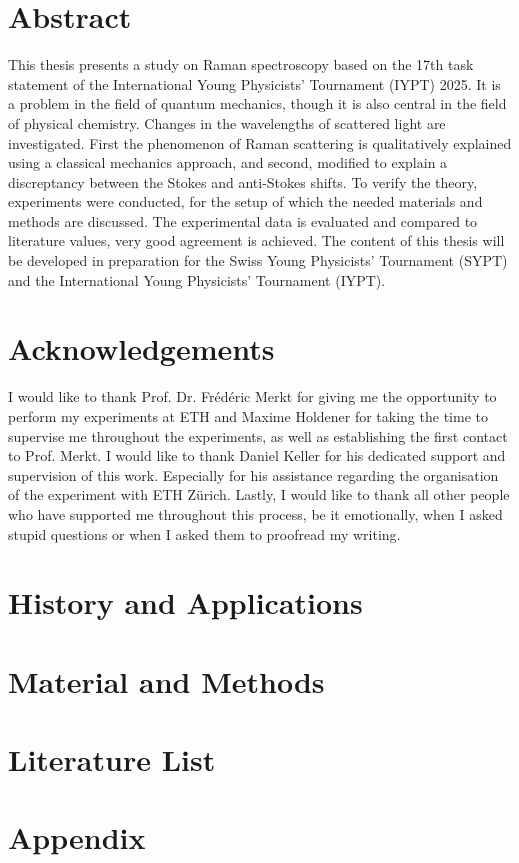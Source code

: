 \documentclass[a4paper]{article}
\begin{document}
\section*{Abstract}

This thesis presents a study on Raman spectroscopy based on the 17th task statement of the International Young Physicists' Tournament (IYPT) 2025. It is a problem in the field of quantum mechanics, though it is also central in the field of physical chemistry. Changes in the wavelengths of scattered light are investigated. First the phenomenon of Raman scattering is qualitatively explained using a classical mechanics approach, and second, modified to explain a discreptancy between the Stokes and anti-Stokes shifts. To verify the theory, experiments were conducted, for the setup of which the needed materials and methods are discussed. The experimental data is evaluated and compared to literature values, very good agreement is achieved. The content of this thesis will be developed in preparation for the Swiss Young Physicists' Tournament (SYPT) and the International Young Physicists' Tournament (IYPT).

\newpage



\section*{Acknowledgements}

I would like to thank Prof. Dr. Frédéric Merkt for giving me the opportunity to perform my experiments at ETH and Maxime Holdener for taking the time to supervise me throughout the experiments, as well as establishing the first contact to Prof. Merkt. I would like to thank Daniel Keller for his dedicated support and supervision of this work. Especially for his assistance regarding the organisation of the experiment with ETH Zürich. Lastly, I would like to thank all other people who have supported me throughout this process, be it emotionally, when I asked stupid questions or when I asked them to proofread my writing.

\newpage
\tableofcontents
\newpage

\section{History and Applications}\label{hist_app}

\newpage


\newpage

\section{Material and Methods}\label{mat_met}

\newpage



\newpage


\newpage



\newpage

\section*{Literature List}
\printbibliography

\newpage

\section{Appendix}

\end{document}
